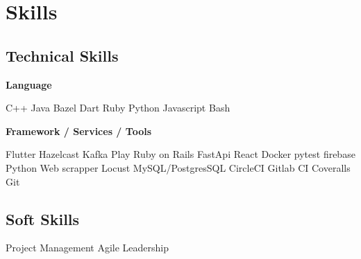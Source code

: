 \documentclass[]{Klement_Resume}
\begin{document}
\begin{minipage}[t]{0.33\textwidth}

\section{Skills}
\subsection{Technical Skills}

{\bf Language}

C++ \textbullet{} Java \textbullet{} Bazel \textbullet{} Dart \textbullet{} Ruby \textbullet{} Python \textbullet{} Javascript \textbullet{} Bash

\sectionsep

{\bf Framework / Services / Tools}

Flutter \textbullet{} Hazelcast \textbullet{} Kafka \textbullet{} Play \textbullet{} Ruby on Rails \textbullet{} FastApi \textbullet{} React \textbullet{} Docker \textbullet{} pytest \textbullet{} firebase \textbullet{} Python Web scrapper \textbullet{} Locust \textbullet{} MySQL/PostgresSQL \textbullet{} CircleCI \textbullet{} Gitlab CI \textbullet{} Coveralls \textbullet{} Git


\sectionsep
\subsection{Soft Skills}
Project Management \textbullet{}  Agile \textbullet{} Leadership
\sectionsep

%
%

\end{minipage} 
\end{document}
